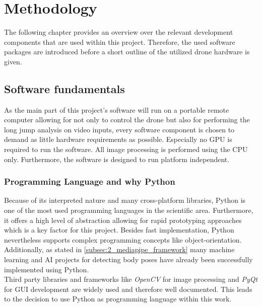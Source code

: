 \graphicspath{{./figures/}}
\chapter{Methodology} 
The following chapter provides an overview over the relevant development 
components that are used within this project.
Therefore, the used software packages are introduced before a short outline of
the utilized drone hardware is given.

\section{Software fundamentals}\label{sec:2_software_fund}
As the main part of this project's software will run on a portable remote
computer allowing for not only to control the drone but also for performing the
long jump analysis on video inputs, every software component is chosen to
demand as little hardware requirements as possible.
Especially no \ac{GPU} is required to run the software.
All image processing is performed using the \ac{CPU} only.
Furthermore, the software is designed to run platform independent.\\

\subsection{Programming Language and why Python}\label{subsec:2_programming_language}
Because of its interpreted nature and many cross-platform libraries, Python is
one of the most used programming languages in the scientific area.
Furthermore, it offers a high level of abstraction allowing for rapid 
prototyping approaches which is a key factor for this project.
Besides fast implementation, Python nevertheless supports complex programming 
concepts like object-orientation.\\
Additionally, as stated in \autoref{subsec:2_mediapipe_framework} many machine
learning and \ac{AI} projects for detecting body poses have already been 
successfully implemented using Python.\\
Third party libraries and frameworks like \textit{OpenCV} for image processing 
and \textit{PyQt} for \ac{GUI} development are widely used and therefore well documented.
This leads to the decision to use Python as programming language within this work. 

